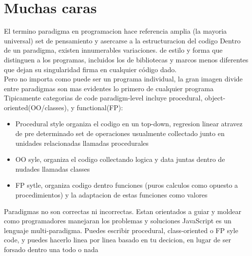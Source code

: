 \section{Muchas caras}
El termino paradigma en programacion hace referencia amplia (la mayoria universal) set de pensamiento y asercarse a la estructuracion del codigo Dentro de un paradigma, existen innumerables variaciones. de estilo y forma que distinguen a los programas, incluidos los de bibliotecas y marcos menos diferentes que dejan su singularidad firma en cualquier código dado.\\
Pero no importa como puede ser un programa individual, la gran imagen divide entre paradigmas son mas evidentes lo primero de cualquier programa\\
Tipicamente categorias de code paradigm-level incluye procedural, object-oriented(OO/classes), y functional(FP):

\begin{itemize}
  \item Procedural style organiza el codigo en un top-down, regresion linear atravez de pre determinado set de operaciones usualmente collectado junto en unidades relacionadas llamadas procedurales
  \item OO syle, organiza el codigo collectando logica y data juntas dentro de nudades llamadas classes
  \item FP sytle, organiza codigo dentro funciones (puros calculos como opuesto a procedimientos) y la adaptacion de estas funciones como valores
\end{itemize}
Paradigmas no son correctas ni incorrectas. Estan orientados a guiar y moldear como programadores manejaran los problemas y soluciones
JavaScript es un lenguaje multi-paradigma. Puedes escribir procedural, class-oriented o FP syle code, y puedes hacerlo linea por linea basado en tu decicion, en lugar de ser forsado dentro una todo o nada\\

